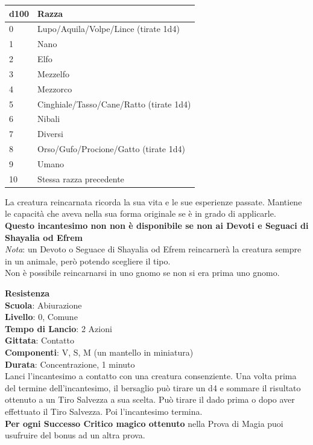 \begin{multicols}{2}
\medskip
\begin{tabular}{ll}
	\textbf{d100} &\textbf{Razza}\\
	\toprule
	0 & Lupo/Aquila/Volpe/Lince (tirate 1d4)\\
	1&Nano\\
	2&Elfo\\
	3&Mezzelfo\\
	4&Mezzorco\\
	5&Cinghiale/Tasso/Cane/Ratto (tirate 1d4)\\
	6&Nibali\\
	7&Diversi\\
	8&Orso/Gufo/Procione/Gatto (tirate 1d4)\\
	9&Umano\\
	10&Stessa razza precedente\\
\end{tabular}

La creatura reincarnata ricorda la sua vita e le sue esperienze passate. Mantiene le capacità che aveva nella sua forma originale se è in grado di applicarle.\\
\textbf{Questo incantesimo non non è disponibile se non ai Devoti e Seguaci di Shayalia od Efrem}\\
\textit{Nota}: un Devoto o Seguace di Shayalia od Efrem reincarnerà la creatura sempre in un animale, però potendo scegliere il tipo.\\
Non è possibile reincarnarsi in uno gnomo se non si era prima uno gnomo.

\medskip\textbf{Resistenza}\\
\textbf{Scuola}: Abiurazione\\
\textbf{Livello}: 0, Comune\\
\textbf{Tempo di Lancio}: 2 Azioni\\
\textbf{Gittata}: Contatto\\
\textbf{Componenti}: V, S, M (un mantello in miniatura)\\
\textbf{Durata}: Concentrazione, 1 minuto\\
Lanci l'incantesimo a contatto con una creatura consenziente. Una volta prima del termine dell'incantesimo, il bersaglio può tirare un d4 e sommare il risultato ottenuto a un Tiro Salvezza a sua scelta. Può tirare il dado prima o dopo aver effettuato il Tiro Salvezza. Poi l'incantesimo termina.\\
\textbf{Per ogni Successo Critico magico ottenuto} nella Prova di Magia puoi usufruire del bonus ad un altra prova.


\end{multicols}
